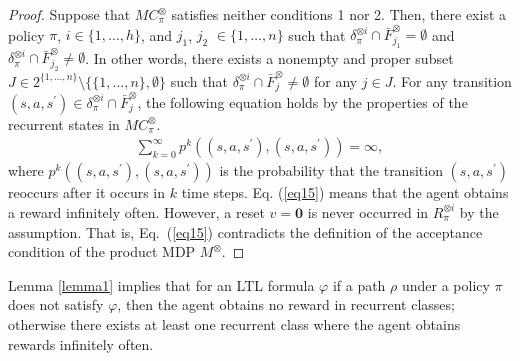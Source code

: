 \documentclass[letterpaper, 10 pt, conference]{ieeeconf}  %
\newtheorem{lemma}{Lemma}
\begin{document}
\begin{proof}
  Suppose that $MC^{\otimes}_{\pi}$ satisfies neither conditions 1 nor 2. Then, there exist a policy $\pi$, $i \in \{ 1, \ldots ,h \}$, and $j_1$, $j_2$ $\in \{ 1, \ldots ,n \}$ such that $\delta^{\otimes i}_{\pi} \cap \bar{F}^{\otimes}_{j_1} = \emptyset$ and $\delta^{\otimes i}_{\pi} \cap \bar{F}^{\otimes}_{j_2} \neq \emptyset$. In other words, there exists a nonempty and proper subset $J \in 2^{\{ 1, \ldots ,n \}} \setminus \{ \{ 1, \ldots ,n \}, \emptyset \}$ such that $ \delta^{\otimes i}_{\pi} \cap \bar{F}^{\otimes}_j \neq \emptyset $ for any $j \in J$.
   For any transition $ (s,a,s^{\prime}) \in \delta^{\otimes i}_{\pi} \cap \bar{F}^{\otimes}_j$, the following equation holds by the properties of the recurrent states in $MC^{\otimes}_{\pi}$\cite{ESS}.
  \begin{align}
    \sum_{k=0}^{\infty} p^k((s,a,s^{\prime}),(s,a,s^{\prime})) = \infty,
    \label{eq15}
  \end{align}
  where $p^k((s,a,s^{\prime}),(s,a,s^{ \prime}))$ is the probability that the transition $(s,a,s^{\prime})$ reoccurs after it occurs in $k$ time steps. Eq. (\ref{eq15}) means that the agent obtains a reward infinitely often. However, a reset $v =\bm{0}$ is never occurred in $R^{\otimes i}_{\pi}$ by the assumption. That is, Eq.\ (\ref{eq15}) contradicts the definition of the acceptance condition of the product MDP $M^{\otimes}$.
\end{proof}

Lemma \ref{lemma1} implies that for an LTL formula $\varphi$ if a path $\rho$ under a policy $\pi$ does not satisfy $\varphi$, then the agent obtains no reward in recurrent classes; otherwise there exists at least one recurrent class where the agent obtains rewards infinitely often.

\end{document}
